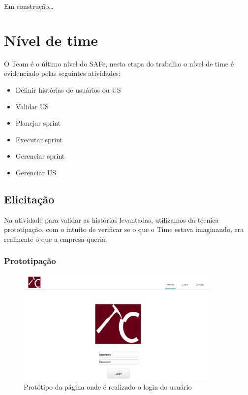   Em construção\ldots

\section{Nível de time}

  O Team é o último nível do SAFe, nesta etapa do trabalho o nível de time é evidenciado pelas seguintes atividades:

  \begin{itemize}
    \item Definir histórias de usuários ou US
    \item Validar US
    \item Planejar sprint
    \item Executar sprint
    \item Gerenciar sprint
    \item Gerenciar US
  \end{itemize}

\subsection{Elicitação}
  Na atividade para validar as histórias levantadas, utilizamos da técnica prototipação, com o intuito de verificar se o que o Time estava imaginando, era realmente o que a empresa queria.
\subsubsection{Prototipação}

  \label{pagina-inicial}

  \begin{figure}[!htb]
    \centering
    \includegraphics[width=10cm, keepaspectratio=false]{figuras/gerencia/pagina-inicial.eps}
    \caption{Protótipo da página onde é realizado o login do usuário}
  \end{figure}


  \label{pagina-upload}

